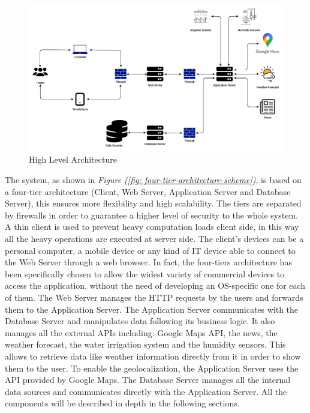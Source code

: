 \documentclass[table, 12pt]{article}
\begin{document}
\begin{center}
    \begin{figure}[H]
        \includegraphics[scale=0.70, center]{assets/4-tier-architecture-scheme.png}
        \caption{High Level Architecture}
        \label{fig: high_level_architecture}
    \end{figure}
\end{center}

The system, as shown in \textit{Figure (\ref{fig: four-tier-architecture-scheme})}, is based on a four-tier architecture (Client, Web Server, Application Server and Database Server), this ensures more flexibility and high scalability.
The tiers are separated by firewalls in order to guarantee a higher level of security to the whole system.
A thin client is used to prevent heavy computation loads client side, in this way all the heavy operations are executed at server side.
The client's devices can be a personal computer, a mobile device or any kind of IT device able to connect to the Web Server through a web browser. In fact, the four-tiers architecture has been specifically chosen to allow the widest variety of commercial devices to access the application, without the need of developing an OS-specific one for each of them.
The Web Server manages the HTTP requests by the users and forwards them to the Application Server.
The Application Server communicates with the Database Server and manipulates data following its business logic.
It also manages all the external APIs including: Google Maps API, the news, the weather forecast, the water irrigation system and the humidity sensors.
This allows to retrieve data like weather information directly from it in order to show them to the user.
To enable the geolocalization, the Application Server uses the API provided by Google Maps.
The Database Server manages all the internal data sources and communicates directly with the Application Server.
All the components will be described in depth in the following sections.
\end{document}
